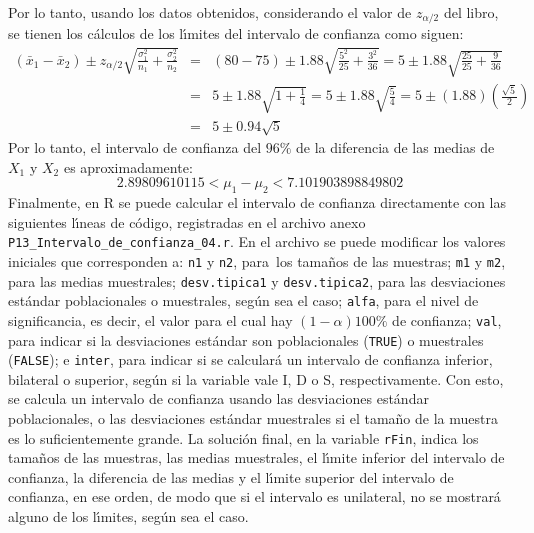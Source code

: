 \begin{solucion}
\begin{equation*}
 \end{equation*}
 Por lo tanto, usando los datos obtenidos, considerando el valor de $z_{\alpha/2}$ del libro, se tienen los c\'alculos de los l\'{\i}mites del intervalo de confianza como siguen:
 \begin{eqnarray*}
  \left( \bar{x}_1 - \bar{x}_2 \right) \pm z_{\alpha/2}\sqrt{\frac{\sigma_1^2}{n_1} + \frac{\sigma_2^2}{n_2}} & = & (80-75) \pm 1.88 \sqrt{\frac{5^2}{25} + \frac{3^2}{36}} = 5 \pm 1.88\sqrt{\frac{25}{25} + \frac{9}{36}} \\
  & = & 5 \pm 1.88\sqrt{1 + \frac{1}{4}} = 5 \pm 1.88\sqrt{\frac{5}{4}} = 5 \pm (1.88) \left( \frac{\sqrt{5}}{2} \right) \\
  & = & 5\pm 0.94\sqrt{5}
 \end{eqnarray*}
 Por lo tanto, el intervalo de confianza del $96\%$ de la diferencia de las medias de $X_1$ y $X_2$ es aproximadamente:
 \begin{equation*}
  2.89809610115 < \mu_1 - \mu_2 < 7.101903898849802
 \end{equation*}
 Finalmente, en R se puede calcular el intervalo de confianza directamente con las siguientes l\'{\i}neas de c\'odigo, registradas en el archivo anexo \texttt{P13\_Intervalo\_de\_confianza\_04.r}. En el archivo se puede modificar los valores iniciales que corresponden a: \texttt{n1} y \texttt{n2}, para\ los tama\~nos de las muestras; \texttt{m1} y \texttt{m2}, para las medias muestrales; \texttt{desv.tipica1} y \texttt{desv.tipica2}, para las desviaciones est\'andar poblacionales o muestrales, seg\'un sea el caso; \texttt{alfa}, para el nivel de significancia, es decir, el valor para el cual hay $(1-\alpha)100\%$ de confianza; \texttt{val}, para indicar si la desviaciones est\'andar son poblacionales (\texttt{TRUE}) o muestrales (\texttt{FALSE}); e \texttt{inter}, para indicar si se calcular\'a un intervalo de confianza inferior, bilateral o superior, seg\'un si la variable vale I, D o S, respectivamente. Con esto, se calcula un intervalo de confianza usando las desviaciones est\'andar poblacionales, o las desviaciones est\'andar muestrales si el tama\~no de la muestra es lo suficientemente grande. La soluci\'on final, en la variable \texttt{rFin}, indica los tama\~nos de las muestras, las medias muestrales, el l\'{\i}mite inferior del intervalo de confianza, la diferencia de las medias y el l\'{\i}mite superior del intervalo de confianza, en ese orden, de modo que si el intervalo es unilateral, no se mostrar\'a alguno de los l\'{\i}mites, seg\'un sea el caso.
 \begin{verbatim}

\end{verbatim}
\end{solucion}
